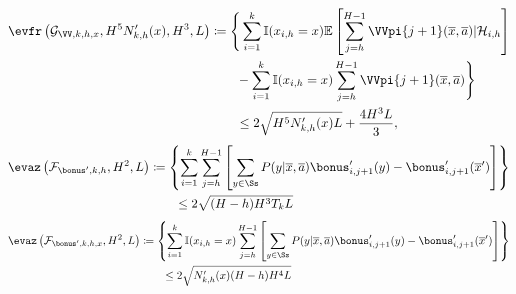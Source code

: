 \begin{align*}
    \evfr\left( \mathcal{G}_{\VV, k, h, x}, H^5 N'_{k,h}(x), H^3, L \right) & \coloneqq \Bigg\{ \sum_{i=1}^k \mathbb{I}(x_{i,h}=x) \mathbb{E} \left[ \sum_{j=h}^{H-1} \VVpi{j+1} (\overline{x}, \overline{a}) | \mathcal{H}_{i,h} \right] \\
    &\qquad - \sum_{i=1}^k \mathbb{I}(x_{i,h}=x) \sum_{j=h}^{H-1} \VVpi{j+1} (\overline{x}, \overline{a}) \Bigg\} \\ 
    &\qquad \le 2\sqrt{H^5 N'_{k,h}(x) L} + \frac{4H^3 L}{3}, \\
\end{align*}
\begin{align*}
    \evaz\left( \mathcal{F}_{\bonus', k, h}, H^2, L \right) &\coloneqq \left\{ \sum_{i=1}^k \sum_{j=h}^{H-1} \left[ \sum_{y \in \Ss} P(y | \overline{x}, \overline{a}) \bonus'_{i,j+1}(y) - \bonus'_{i,j+1}(\overline{x}') \right] \right\} \\
    &\qquad \le 2 \sqrt{(H-h) H^3 T_k L} \\
\end{align*}
\begin{align*}
    \evaz\left( \mathcal{F}_{\bonus', k, h, x}, H^2, L \right) &\coloneqq \left\{ \sum_{i=1}^k \mathbb{I}(x_{i,h}=x) \sum_{j=h}^{H-1} \left[ \sum_{y \in \Ss} P(y | \overline{x}, \overline{a}) \bonus'_{i,j+1}(y) - \bonus'_{i,j+1}(\overline{x}') \right] \right\} \\
    &\qquad \le 2 \sqrt{N'_{k,h}(x) (H-h) H^4 L} \\
\end{align*}